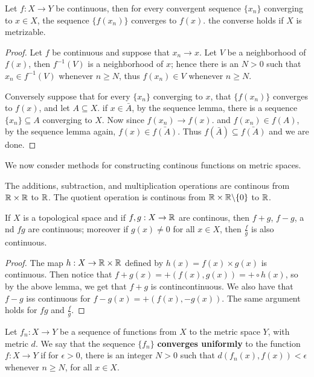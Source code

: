 \begin{theorem}\label{2.3.6}
    Let $f:X \rightarrow Y$ be continuous, then for every convergent sequence  $\{x_n\}$ converging
    to $x \in X$, the sequence  $\{f(x_n)\}$ converges to $f(x)$. the converse holds if $X$ is
    metrizable.
\end{theorem}
\begin{proof}
    Let $f$ be continuous and suppose that  $x_n \rightarrow x$. Let  $V$ be a neighborhood of
    $f(x)$, then $f^{-1}(V)$ is a neighborhood of $x$; hence there is an  $N>0$ such that  $x_n \in
    f^{-1}(V)$ whenever $n \geq N$, thus  $f(x_n) \in V$ whenever $n \geq N$.

    Conversely suppose that for every  $\{x_n\}$ converging to $x$, that  $\{f(x_n)\}$ converges to
    $f(x)$, and let $A \subseteq X$. if  $x \in \bar{A}$, by the sequence lemma, there is a sequence
    $\{x_n\} \subseteq A$ converging to $X$. Now since  $f(x_n) \rightarrow f(x)$. and $f(x_n) \in
    f(A)$, by the sequence lemma again, $f(x) \in \bar{f(A)}$.  Thus $f(\bar{A}) \subseteq
    \bar{f(A)}$ and we are done.
\end{proof}

We now consder methods for constructing continous functions on metric spaces.

\begin{lemma}\label{2.3.7}
    The additions, subtraction, and multiplication operations are continous from $\mathbb{R} \times \mathbb{R}$ to
    $\mathbb{R}$. The quotient operation is continous from  $\mathbb{R} \times \mathbb{R} \backslash \{0\}$ to $\mathbb{R}$.
\end{lemma}

\begin{theorem}\label{2.3.8}
    If $X$ is a topological space and if  $f,g:X \rightarrow \mathbb{R}$ are continous, then  $f+g$,  $f-g$,
    a nd $fg$ are continuous; moreover if  $g(x) \neq 0$ for all $x \in X$, then $\frac{f}{g}$ is
    also continuous.
\end{theorem}
\begin{proof}
    The map $h:X \rightarrow \mathbb{R} \times \mathbb{R}$ defined by $h(x)=f(x) \times g(x)$ is continuous. Then
    notice that $f+g(x)=+(f(x),g(x))=+\circ h(x)$, so by the above lemma, we get that $f+g$ is
    contincontinuous. We also have that  $f-g$ iss continuous for  $f-g(x)=+(f(x),-g(x))$. The same
    argument holds for $fg$ and  $ \frac{f}{g}$.
\end{proof}

\begin{definition}
    Let $f_n:X \rightarrow Y$ be a sequence of functions from $X$ to the metric space  $Y$, with
    metric  $d$. We say that the sequence  $\{f_n\}$ \textbf{converges uniformly} to the function
    $f:X \rightarrow Y$ if for  $\epsilon>0$, there is an integer $N>0$ such that
    $d(f_n(x),f(x))<\epsilon$ whenever $n \geq N$, for all  $x \in X$.
\end{definition}

